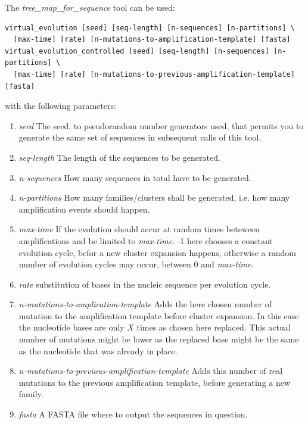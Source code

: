 The \emph{tree\_map\_for\_sequence} tool can be used:
\begin{lstlisting}
virtual_evolution [seed] [seq-length] [n-sequences] [n-partitions] \
  [max-time] [rate] [n-mutations-to-amplification-template] [fasta]
virtual_evolution_controlled [seed] [seq-length] [n-sequences] [n-partitions] \
  [max-time] [rate] [n-mutations-to-previous-amplification-template] [fasta]
\end{lstlisting}
with the following parameters:
\begin{enumerate}
  \item \emph{seed} The seed, to pseudorandom number generators used,
    that permits you to generate the same set of sequences
    in subsequent calls of this tool.
  \item \emph{seq-length} The length of the sequences to be generated.
  \item \emph{n-sequences} How many sequences in total have to be
    generated.
  \item \emph{n-partitions} How many families/clusters shall be
    generated, i.e. how many amplification events should happen.
  \item \emph{max-time} If the evolution should accur at random times
    beteween amplifications and be limited to \emph{max-time}. -1 here
    chooses a constant evolution cycle, befor a new cluster expansion
    happens, otherwise a random number of evolution cycles may occur,
    between 0 and \emph{max-time}.
  \item \emph{rate} substitution of bases in the nucleic sequence per
    evolution cycle.
  \item \emph{n-mutations-to-amplication-template} Adds the here
    chosen number of mutation to the amplification template before
    cluster expansion. In this case the nucleotide bases are only $X$
    times as chosen here replaced. This actual number of mutations
    might be lower as the replaced base might be the same as the
    nucleotide that was already in place.
  \item \emph{n-mutations-to-previous-amplification-template} Adds
    this number of real mutations to the previous amplification
    template, before generating a new family.
  \item \emph{fasta} A FASTA file where to output the sequences in
    question.
\end{enumerate}

